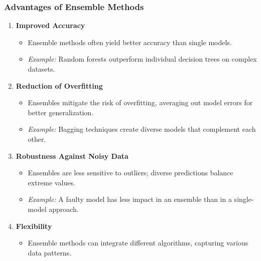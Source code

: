 \documentclass[aspectratio=169]{beamer}
\begin{document}
\begin{frame}[fragile]
    \frametitle{Advantages of Ensemble Methods}
    \begin{enumerate}
        \item \textbf{Improved Accuracy} 
            \begin{itemize}
                \item Ensemble methods often yield better accuracy than single models.
                \item \textit{Example:} Random forests outperform individual decision trees on complex datasets.
            \end{itemize}
        
        \item \textbf{Reduction of Overfitting}
            \begin{itemize}
                \item Ensembles mitigate the risk of overfitting, averaging out model errors for better generalization.
                \item \textit{Example:} Bagging techniques create diverse models that complement each other.
            \end{itemize}

        \item \textbf{Robustness Against Noisy Data}
            \begin{itemize}
                \item Ensembles are less sensitive to outliers; diverse predictions balance extreme values.
                \item \textit{Example:} A faulty model has less impact in an ensemble than in a single-model approach.
            \end{itemize}

        \item \textbf{Flexibility}
            \begin{itemize}
                \item Ensemble methods can integrate different algorithms, capturing various data patterns.
            \end{itemize}
    \end{enumerate}
\end{frame}
\end{document}

